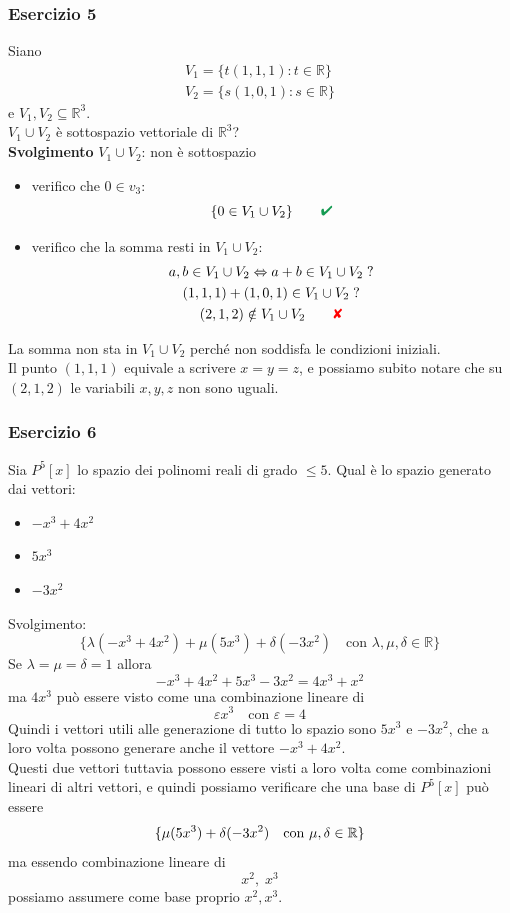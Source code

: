 \documentclass[italian]{article}
\newcommand{\crossmark}{\textcolor{red}{\text{$\qquad$\ding{56}}}}
\renewcommand{\checkmark}{\textcolor{ForestGreen}{\text{$\qquad$\ding{52}}}}
\newcommand{\ins}[1]{\text{$\mathbb{#1}$}}
\begin{document}
\subsubsection{Esercizio 5}
Siano
\begin{gather*}
	V_1 = \{ t(1,1,1) : t \in \ins{R} \} \\
	V_2 = \{ s(1,0,1) : s \in \ins{R} \}
\end{gather*}
e $V_1,V_2 \subseteq \ins{R}^3$.\\[2mm]
$V_1 \cup V_2$ è sottospazio vettoriale di $\ins{R}^3$?\\

\noindent\textbf{Svolgimento} $V_1 \cup V_2$: non è sottospazio
\begin{itemize}
	\item verifico che $0 \in v_3$:
	\[
		\{ 0 \in V_1 \cup V_2 \} \checkmark
	\]
	\item verifico che la somma resti in $V_1 \cup V_2$:
	\begin{gather*}
		a,b \in V_1 \cup V_2 \Leftrightarrow a + b \in V_1 \cup V_2 \; ? \\
		(1,1,1)+(1,0,1) \in V_1 \cup V_2 \; ? \\
		(2,1,2) \notin V_1 \cup V_2 \crossmark
	\end{gather*}
\end{itemize}
La somma non sta in $V_1 \cup V_2$ perché non soddisfa le condizioni iniziali.\\
Il punto $(1,1,1)$ equivale a scrivere $x=y=z$, e possiamo subito notare che su $(2,1,2)$ le variabili $x,y,z$ non sono uguali.


\subsubsection{Esercizio 6}
Sia $P^5[x]$ lo spazio dei polinomi reali di grado $\leq 5$. Qual è lo spazio generato dai vettori:
\begin{itemize}
	\item $-x^3 + 4x^2$ 
	\item $5x^3$
	\item $-3x^2$
\end{itemize}
Svolgimento:
\[
	\{ \lambda(-x^3 + 4x^2) + \mu(5x^3) + \delta(-3x^2) \quad \text{con } \lambda, \mu, \delta \in \ins{R}\}
\]
Se $\lambda = \mu = \delta = 1$ allora
\[
	-x^3 + 4x^2 + 5x^3 - 3x^2 = 4x^3 + x^2
\]
ma $4x^3$ può essere visto come una combinazione lineare di
\[
	\varepsilon x^3 \quad \text{con } \varepsilon = 4
\]
Quindi i vettori utili alle generazione di tutto lo spazio sono $5x^3$ e $-3x^2$, che a loro volta possono generare anche il vettore $-x^3 + 4x^2$. \\[2mm]
Questi due vettori tuttavia possono essere visti a loro volta come combinazioni lineari di altri vettori, e quindi possiamo verificare che una base di $P^5[x]$ può essere 
\[
	\{  \mu(5x^3) + \delta(-3x^2) \quad \text{con } \mu, \delta \in \ins{R} \} \\
\]
ma essendo combinazione lineare di 
\[
	x^2 ,\; x^3
\] possiamo assumere come base proprio $x^2, x^3$.
\end{document}
